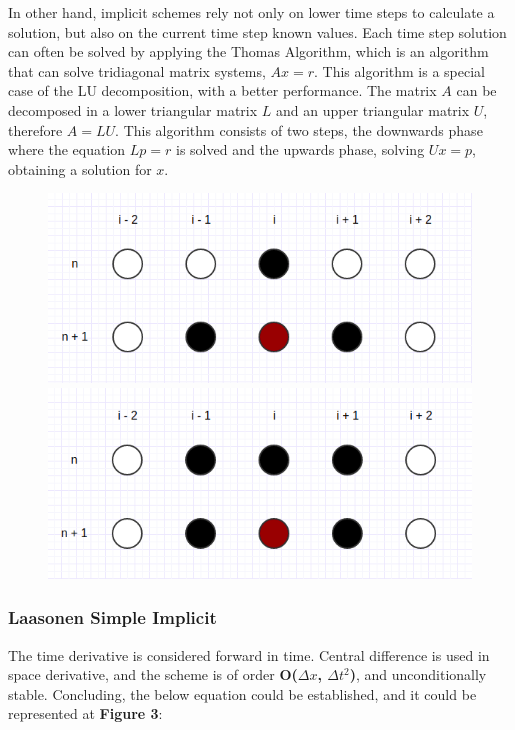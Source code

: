 \documentclass[12pt]{article}
\begin{document}
\par In other hand, implicit schemes rely not only on lower time steps to calculate a solution, but also on the current time step known values. Each time step solution can often be solved by applying the Thomas Algorithm, which is an algorithm that can solve tridiagonal matrix systems, $Ax = r$\cite{thomas}. This algorithm is a special case of the LU decomposition, with a better performance. The matrix $A$ can be decomposed in a lower triangular matrix $L$ and an upper triangular matrix $U$, therefore $A = LU$\cite{thomas}. This algorithm consists of two steps, the downwards phase where the equation $Lp = r$ is solved and the upwards phase, solving $Ux = p$\cite{thomas}, obtaining a solution for $x$. 

\begin{figure}[!htb]
\centering
\begin{minipage}{.5\textwidth}
  \centering
  \includegraphics[width=.8\linewidth]{laasonen.png}
\end{minipage}%
\begin{minipage}{.5\textwidth}
  \centering
  \includegraphics[width=.8\linewidth]{crank-nicholson.png}
\end{minipage}
\end{figure}

\subsubsection*{Laasonen Simple Implicit}
\par The time derivative is considered forward in time. Central difference is used in space derivative, and the scheme is of order \textbf{O($\Delta x $, $\Delta t ^2$)}\cite{hoffman}, and unconditionally stable. Concluding, the below equation could be established, and it could be represented at \textbf{Figure 3}:
\end{document}
